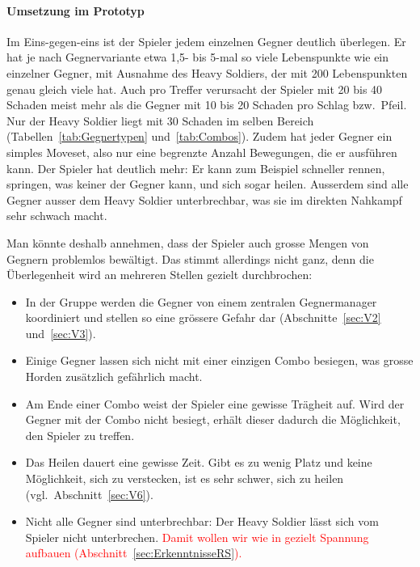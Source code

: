 \documentclass[../Main.tex]{subfiles}
\begin{document}
\paragraph{Umsetzung im Prototyp}
Im Eins-gegen-eins ist der Spieler jedem einzelnen Gegner deutlich überlegen. Er hat je nach Gegnervariante etwa 1,5- bis 5-mal so viele Lebenspunkte wie ein einzelner Gegner, mit Ausnahme des Heavy Soldiers, der mit 200 Lebenspunkten genau gleich viele hat. Auch pro Treffer verursacht der Spieler mit 20 bis 40 Schaden meist mehr als die Gegner mit 10 bis 20 Schaden pro Schlag bzw.\ Pfeil. Nur der Heavy Soldier liegt mit 30 Schaden im selben Bereich (Tabellen~\ref{tab:Gegnertypen} und~\ref{tab:Combos}). Zudem hat jeder Gegner ein simples Moveset, also nur eine begrenzte Anzahl Bewegungen, die er ausführen kann. Der Spieler hat deutlich mehr: Er kann zum Beispiel schneller rennen, springen, was keiner der Gegner kann, und sich sogar heilen. Ausserdem sind alle Gegner ausser dem Heavy Soldier unterbrechbar, was sie im direkten Nahkampf sehr schwach macht.

Man könnte deshalb annehmen, dass der Spieler auch grosse Mengen von Gegnern problemlos bewältigt. Das stimmt allerdings nicht ganz, denn die Überlegenheit wird an mehreren Stellen gezielt durchbrochen:

\begin{itemize}[leftmargin=1.5cm]
    \item In der Gruppe werden die Gegner von einem zentralen Gegnermanager koordiniert und stellen so eine grössere Gefahr dar (Abschnitte~\ref{sec:V2} und~\ref{sec:V3}).
    \item Einige Gegner lassen sich nicht mit einer einzigen Combo besiegen, was grosse Horden zusätzlich gefährlich macht.
    \item Am Ende einer Combo weist der Spieler eine gewisse Trägheit auf. Wird der Gegner mit der Combo nicht besiegt, erhält dieser dadurch die Möglichkeit, den Spieler zu treffen.
    \item Das Heilen dauert eine gewisse Zeit. Gibt es zu wenig Platz und keine Möglichkeit, sich zu verstecken, ist es sehr schwer, sich zu heilen (vgl.~Abschnitt~\ref{sec:V6}).
    \item Nicht alle Gegner sind unterbrechbar: Der Heavy Soldier lässt sich vom Spieler nicht unterbrechen. \textcolor{red}{Damit wollen wir wie in  gezielt Spannung aufbauen (Abschnitt~\ref{sec:ErkenntnisseRS}).}
\end{itemize}
\end{document}
